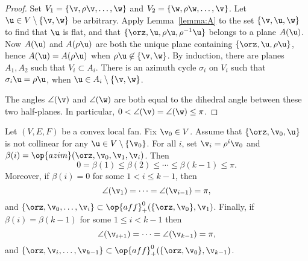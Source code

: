 \begin{proof} Set $V_1 = \{\v,\rho \v,\ldots,\w\}$ and $V_2 =
\{\w,\rho \w,\ldots,\v\}$.  Let $\u\in V\setminus\{\v,\w\}$ be
arbitrary.  Apply Lemma~\ref{lemma:A} to the set $\{\v,\u,\w\}$ to
find that $\u$ is flat, and that $\{\orz,\u,\rho \u,\rho^{-1} \u\}$
belongs to a plane $A(\u)$.  Now $A(\u)$ and $A(\rho \u)$ are both
the unique plane containing $\{\orz,\u,\rho \u\}$, hence $A(\u) =
A(\rho \u)$ when $\rho \u\not\in \{\v,\w\}$.  By induction, there
are planes $A_1, A_2$ such that $V_i\subset A_i$.  There is an
azimuth cycle $\sigma_i$ on $V_i$ such that $\sigma_i \u = \rho \u$,
when $\u \in A_i\setminus \{\v,\w\}$.

The angles $\angle(\v)$ and $\angle(\w)$ are both equal to the
dihedral angle between these two half-planes.  In particular,
$0<\angle(\v)=\angle(\w)\le\pi$.
\end{proof}




\begin{lemma}[monotonicity] 
\label{lemma:monotone}
  Let $(V,E,F)$ be a convex local fan. Fix $\v_0\in V$.  Assume that $\{\orz,\v_0,\u\}$
is not collinear for any $\u\in V\setminus\{\v_0\}$.  For
  all $i$, set $\v_i = \rho^i \v_0$ and $\beta(i) =
  \op{azim}(\orz,\v_0,\v_1,\v_i)$.  Then
\begin{displaymath}0=\beta(1)\le \beta(2)\le \cdots\le
\beta(k-1)\le\pi.\end{displaymath}
Moreover, if $\beta(i)=0$ for some $1<i \le k-1$, then
\begin{displaymath}
\angle(\v_1) = \cdots = \angle(\v_{i-1}) = \pi,
\end{displaymath}
and $\{\orz,\v_0,\ldots,\v_i\} \subset \op{aff}^0_+(\{\orz,\v_0\},\v_1)$.
Finally, if $\beta(i)=\beta(k-1)$ for some $1\le i<k-1$ then 
\begin{displaymath}
\angle(\v_{i+1}) = \cdots = \angle(\v_{k-1}) = \pi,
\end{displaymath}
and $\{\orz,\v_i,\ldots,\v_{k-1}\} \subset
\op{aff}^0_+(\{\orz,\v_0\},\v_{k-1})$.
\end{lemma}

